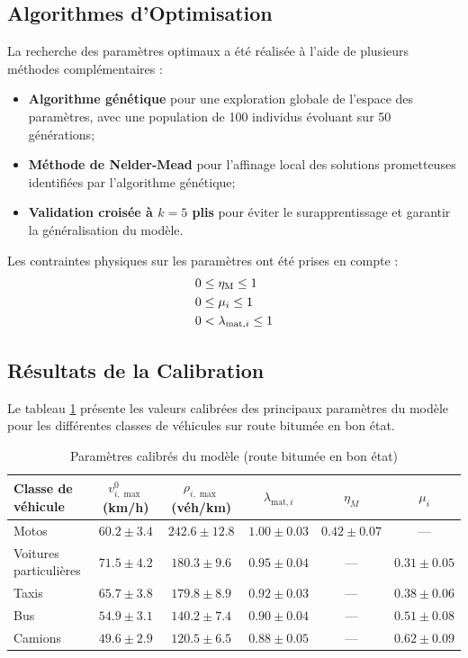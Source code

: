 \subsection{Algorithmes d'Optimisation}
\label{subsec:algorithmes_optimisation}

La recherche des paramètres optimaux a été réalisée à l'aide de plusieurs méthodes complémentaires :

\begin{itemize}
\item \textbf{Algorithme génétique} pour une exploration globale de l'espace des paramètres, avec une population de 100 individus évoluant sur 50 générations;
\item \textbf{Méthode de Nelder-Mead} pour l'affinage local des solutions prometteuses identifiées par l'algorithme génétique;
\item \textbf{Validation croisée à $k=5$ plis} pour éviter le surapprentissage et garantir la généralisation du modèle.
\end{itemize}

Les contraintes physiques sur les paramètres ont été prises en compte :
\begin{align}
0 &\leq \eta_{\text{M}} \leq 1\\
0 &\leq \mu_{i} \leq 1\\
0 &< \lambda_{\text{mat},{i}} \leq 1
\end{align}

\subsection{Résultats de la Calibration}
\label{subsec:resultats_calibration}

Le tableau \ref{tab:parametres_calibres} présente les valeurs calibrées des principaux paramètres du modèle pour les différentes classes de véhicules sur route bitumée en bon état.

\begin{table}[htbp]
\centering
\caption{Paramètres calibrés du modèle (route bitumée en bon état)}
\label{tab:parametres_calibres}
\begin{tabular}{lccccc}
\toprule
\textbf{Classe de véhicule} & $v_{i,\max}^0$ (km/h) & $\rho_{i,\max}$ (véh/km) & $\lambda_{\text{mat},i}$ & $\eta_M$ & $\mu_i$ \\
\midrule
Motos & $60.2 \pm 3.4$ & $242.6 \pm 12.8$ & $1.00 \pm 0.03$ & $0.42 \pm 0.07$ & --- \\
Voitures particulières & $71.5 \pm 4.2$ & $180.3 \pm 9.6$ & $0.95 \pm 0.04$ & --- & $0.31 \pm 0.05$ \\
Taxis & $65.7 \pm 3.8$ & $179.8 \pm 8.9$ & $0.92 \pm 0.03$ & --- & $0.38 \pm 0.06$ \\
Bus & $54.9 \pm 3.1$ & $140.2 \pm 7.4$ & $0.90 \pm 0.04$ & --- & $0.51 \pm 0.08$ \\
Camions & $49.6 \pm 2.9$ & $120.5 \pm 6.5$ & $0.88 \pm 0.05$ & --- & $0.62 \pm 0.09$ \\
\bottomrule
\end{tabular}
\end{table}


